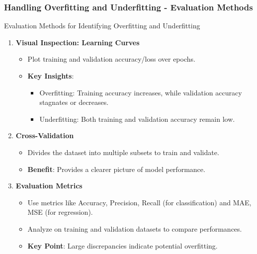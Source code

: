 \documentclass[aspectratio=169]{beamer}
\begin{document}
\begin{frame}[fragile]
    \frametitle{Handling Overfitting and Underfitting - Evaluation Methods}
    \begin{block}{Evaluation Methods for Identifying Overfitting and Underfitting}
        \begin{enumerate}
            \item \textbf{Visual Inspection: Learning Curves}
            \begin{itemize}
                \item Plot training and validation accuracy/loss over epochs.
                \item \textbf{Key Insights}:
                \begin{itemize}
                    \item Overfitting: Training accuracy increases, while validation accuracy stagnates or decreases.
                    \item Underfitting: Both training and validation accuracy remain low.
                \end{itemize}
            \end{itemize}

            \item \textbf{Cross-Validation}
            \begin{itemize}
                \item Divides the dataset into multiple subsets to train and validate.
                \item \textbf{Benefit}: Provides a clearer picture of model performance.
            \end{itemize}

            \item \textbf{Evaluation Metrics}
            \begin{itemize}
                \item Use metrics like Accuracy, Precision, Recall (for classification) and MAE, MSE (for regression).
                \item Analyze on training and validation datasets to compare performances.
                \item \textbf{Key Point}: Large discrepancies indicate potential overfitting.
            \end{itemize}
        \end{enumerate}
    \end{block}
\end{frame}
\end{document}
